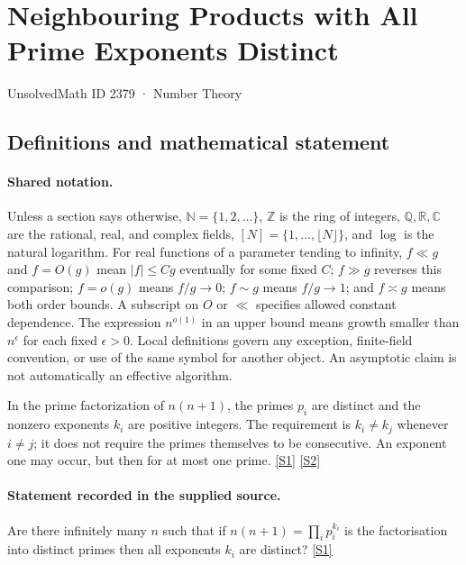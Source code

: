 \documentclass[11pt,a4paper]{article}
\newcommand{\N}{\mathbb{N}}
\newcommand{\Z}{\mathbb{Z}}
\newcommand{\Q}{\mathbb{Q}}
\newcommand{\R}{\mathbb{R}}
\newcommand{\C}{\mathbb{C}}
\newcommand{\sref}[2]{\hyperlink{source:#1:#2}{[S#2]}}
\begin{document}

\setcounter{section}{2378}

\section{Neighbouring Products with All Prime Exponents Distinct}\label{2379}

{\small\sffamily UnsolvedMath ID 2379 · Number Theory}

\subsection{Definitions and mathematical statement}

\paragraph{Shared notation.}Unless a section says otherwise, $\N=\{1,2,\ldots\}$,
$\Z$ is the ring of integers, $\Q,\R,\C$ are the rational, real, and complex
fields, $[N]=\{1,\ldots,\lfloor N\rfloor\}$, and $\log$ is the natural
logarithm. For real functions of a parameter tending to infinity,
$f\ll g$ and $f=O(g)$ mean $|f|\leq Cg$ eventually for some fixed $C$;
$f\gg g$ reverses this comparison; $f=o(g)$ means $f/g\to0$;
$f\sim g$ means $f/g\to1$; and $f\asymp g$ means both order bounds.
A subscript on $O$ or $\ll$ specifies allowed constant dependence.
The expression $n^{o(1)}$ in an upper bound means growth smaller than
$n^\epsilon$ for each fixed $\epsilon>0$. Local definitions govern any
exception, finite-field convention, or use of the same symbol for another
object. An asymptotic claim is not automatically an effective algorithm.



In the prime factorization of $n(n+1)$, the primes $p_i$ are distinct and the nonzero exponents $k_i$ are positive integers. The requirement is $k_i\ne k_j$ whenever $i\ne j$; it does not require the primes themselves to be consecutive. An exponent one may occur, but then for at most one prime. \sref{2379}{1} \sref{2379}{2}

\paragraph{Statement recorded in the supplied source.}
Are there infinitely many $n$ such that if $ n(n+1) = \prod_i p_i^{k_i} $ is the factorisation into distinct primes then all exponents $k_i$ are distinct? \sref{2379}{1}
\end{document}
